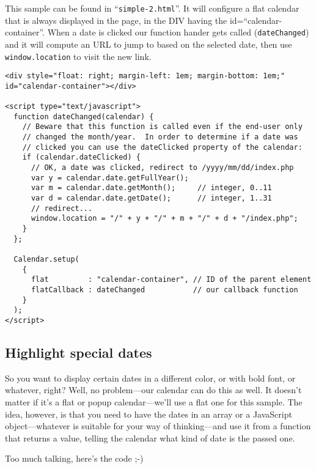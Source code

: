 \documentclass[a4paper,twoside,10pt]{dynadoc}
\begin{document}
This sample can be found in “\texttt{simple-2.html}”.  It will configure a
flat calendar that is always displayed in the page, in the DIV having the
id=“calendar-container”.  When a date is clicked our function hander gets
called (\texttt{dateChanged}) and it will compute an URL to jump to based on
the selected date, then use \texttt{window.location} to visit the new link.

\begin{verbatim}
<div style="float: right; margin-left: 1em; margin-bottom: 1em;"
id="calendar-container"></div>

<script type="text/javascript">
  function dateChanged(calendar) {
    // Beware that this function is called even if the end-user only
    // changed the month/year.  In order to determine if a date was
    // clicked you can use the dateClicked property of the calendar:
    if (calendar.dateClicked) {
      // OK, a date was clicked, redirect to /yyyy/mm/dd/index.php
      var y = calendar.date.getFullYear();
      var m = calendar.date.getMonth();     // integer, 0..11
      var d = calendar.date.getDate();      // integer, 1..31
      // redirect...
      window.location = "/" + y + "/" + m + "/" + d + "/index.php";
    }
  };

  Calendar.setup(
    {
      flat         : "calendar-container", // ID of the parent element
      flatCallback : dateChanged           // our callback function
    }
  );
</script>
\end{verbatim}

\subsection{Highlight special dates}

So you want to display certain dates in a different color, or with bold
font, or whatever, right?  Well, no problem---our calendar can do this as
well.  It doesn't matter if it's a flat or popup calendar---we'll use a flat
one for this sample.  The idea, however, is that you need to have the dates
in an array or a JavaScript object---whatever is suitable for your way of
thinking---and use it from a function that returns a value, telling the
calendar what kind of date is the passed one.

Too much talking, here's the code ;-)
\end{document}

